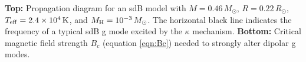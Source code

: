 \label{fig:sdBProp}
{\bf Top:} Propagation diagram for an sdB model with $M=0.46 \, M_\odot$, $R= 0.22 \, R_\odot$, $T_{\rm eff} = 2.4 \times 10^4 \, {\rm K}$, and $M_{\rm H} = 10^{-3} \, M_\odot$. The horizontal black line indicates the frequency of a typical sdB g mode excited by the $\kappa$ mechanism. {\bf Bottom:} Critical magnetic field strength $B_c$ (equation \ref{eqn:Bc}) needed to strongly alter dipolar g modes.
  
  
  